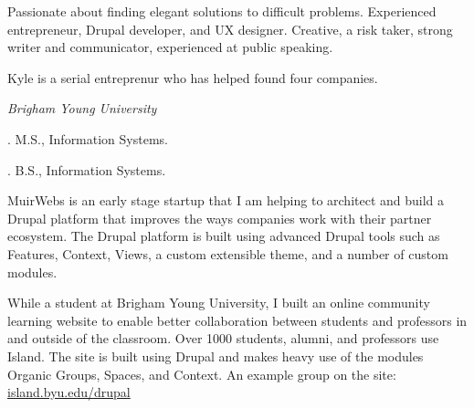 \documentclass[11pt]{article}
\begin{document}
\medskip

\reversemarginpar

\medskip       

\medskip
{}

\noindent Passionate about finding elegant solutions to difficult problems. Experienced entrepreneur, Drupal developer, and UX designer. Creative, a risk taker, strong writer and communicator, experienced at public speaking.

\medskip

\ind Kyle is a serial entreprenur who has helped found four companies.

\bigskip



\noindent\emph{Brigham Young University \vspace{0.15in}}

. M.S., Information Systems.

. B.S., Information Systems.

\bigskip
 
\medskip


\noindent MuirWebs is an early stage startup that I am helping to architect and build a Drupal platform that improves the ways companies work with their partner ecosystem. The Drupal platform is built using advanced Drupal tools such as Features, Context, Views, a custom extensible theme, and a number of custom modules.

\bigskip


\noindent While a student at Brigham Young University, I built an online community learning website to enable better collaboration between students and professors in and outside of the classroom. Over 1000 students, alumni, and professors use Island. The site is built using Drupal and makes heavy use of the modules Organic Groups, Spaces, and Context. An example group on the site: \href{https://island.byu.edu/drupal}{island.byu.edu/drupal}
\end{document}
